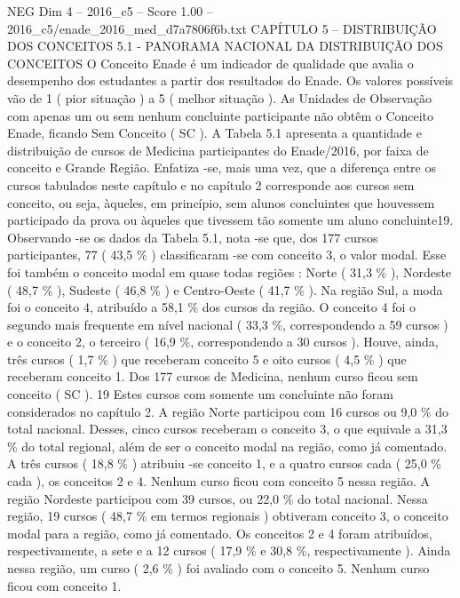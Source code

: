\begin{textsample}{NEG Dim 4 – 2016\_c5 – Score 1.00 – 2016\_c5/enade\_2016\_med\_d7a7806f6b.txt}  \label{ex:f4_neg_250}
CAPÍTULO 5 – DISTRIBUIÇÃO DOS CONCEITOS 5.1 - PANORAMA NACIONAL DA DISTRIBUIÇÃO DOS CONCEITOS O Conceito Enade é um indicador de qualidade que avalia o desempenho dos estudantes a partir dos resultados do Enade.
Os valores possíveis vão de 1 ( pior situação ) a 5 ( melhor situação ).
As Unidades de Observação com apenas um ou sem nenhum concluinte participante não obtêm o Conceito Enade, ficando Sem Conceito ( SC ).
A Tabela 5.1 apresenta a quantidade e distribuição de cursos de Medicina participantes do Enade/2016, por faixa de conceito e Grande Região.
Enfatiza -se, mais uma vez, que a diferença entre os cursos tabulados neste capítulo e no capítulo 2 corresponde aos cursos sem conceito, ou seja, àqueles, em princípio, sem alunos concluintes que houvessem participado da prova ou àqueles que tivessem tão somente um aluno concluinte19.
Observando -se os dados da Tabela 5.1, nota -se que, dos 177 cursos participantes, 77 ( 43,5 \% ) classificaram -se com conceito 3, o valor modal.
Esse foi também o conceito modal em quase todas regiões : Norte ( 31,3 \% ), Nordeste ( 48,7 \% ), Sudeste ( 46,8 \% ) e Centro-Oeste ( 41,7 \% ).
Na região Sul, a moda foi o conceito 4, atribuído a 58,1 \% dos cursos da região.
O conceito 4 foi o segundo mais frequente em nível nacional ( 33,3 \%, correspondendo a 59 cursos ) e o conceito 2, o terceiro ( 16,9 \%, correspondendo a 30 cursos ).
Houve, ainda, três cursos ( 1,7 \% ) que receberam conceito 5 e oito cursos ( 4,5 \% ) que receberam conceito 1.
Dos 177 cursos de Medicina, nenhum curso ficou sem conceito ( SC ). 19 Estes cursos com somente um concluinte não foram considerados no capítulo 2.
A região Norte participou com 16 cursos ou 9,0 \% do total nacional.
Desses, cinco cursos receberam o conceito 3, o que equivale a 31,3 \% do total regional, além de ser o conceito modal na região, como já comentado.
A três cursos ( 18,8 \% ) atribuiu -se conceito 1, e a quatro cursos cada ( 25,0 \% cada ), os conceitos 2 e 4.
Nenhum curso ficou com conceito 5 nessa região.
A região Nordeste participou com 39 cursos, ou 22,0 \% do total nacional.
Nessa região, 19 cursos ( 48,7 \% em termos regionais ) obtiveram conceito 3, o conceito modal para a região, como já comentado.
Os conceitos 2 e 4 foram atribuídos, respectivamente, a sete e a 12 cursos ( 17,9 \% e 30,8 \%, respectivamente ).
Ainda nessa região, um curso ( 2,6 \% ) foi avaliado com o conceito 5.
Nenhum curso ficou com conceito 1.

\end{textsample}
